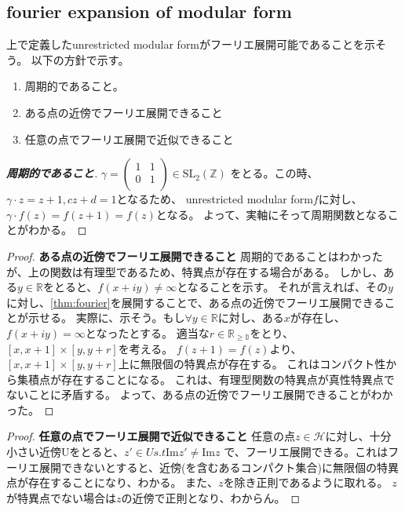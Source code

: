 \documentclass{ujarticle}
\begin{document}
\subsection{fourier expansion of modular form}
\label{sub:fourier expansion of modular form}
上で定義したunrestricted modular formがフーリエ展開可能であることを示そう。
以下の方針で示す。
\begin{enumerate}
  \setlength{\parskip}{0cm} %
  \setlength{\itemsep}{0cm} %
  \item 周期的であること。
  \item ある点の近傍でフーリエ展開できること
  \item 任意の点でフーリエ展開で近似できること
\end{enumerate}
\begin{proof}[\bf{周期的であること}]

$\gamma = \begin{pmatrix}
  1 & 1 \\
  0 & 1 \\
\end{pmatrix} \in \mathrm{SL}_2(\mathbb{Z})$
をとる。この時、$\gamma \cdot z = z +1, cz+d =1$となるため、
unrestricted modular form$f$に対し、$\gamma \cdot f(z)= f(z +1)=f(z)$となる。
よって、実軸にそって周期関数となることがわかる。
\end{proof}
\begin{proof}{\bf{ある点の近傍でフーリエ展開できること}}
周期的であることはわかったが、上の関数は有理型であるため、特異点が存在する場合がある。
しかし、ある$y \in \mathbb{R}$をとると、$f(x +iy) \neq \infty$となることを示す。
それが言えれば、その$y$に対し、\ref{thm:fourier}を展開することで、ある点の近傍でフーリエ展開できることが示せる。
実際に、示そう。もし$ \forall y \in \mathbb{R}$に対し、ある$x$が存在し、$f(x +iy)=\infty$となったとする。
適当な$r \in \mathbb{R_{\ge 0}}$をとり、$[x,x+1] \times [y,y +r]$を考える。
$f(z + 1)=f(z)$より、$[x,x+1] \times [y,y +r]$上に無限個の特異点が存在する。
これはコンパクト性から集積点が存在することになる。
これは、有理型関数の特異点が真性特異点でないことに矛盾する。
よって、ある点の近傍でフーリエ展開できることがわかった。
\end{proof}
\begin{proof}{\bf{任意の点でフーリエ展開で近似できること}}
  任意の点$z \in \mathcal{H}$に対し、十分小さい近傍Uをとると、$z' \in U s.t \mathrm{Im}z' \neq \mathrm{Im}z$
  で、フーリエ展開できる。これはフーリエ展開できないとすると、近傍(を含むあるコンパクト集合)に無限個の特異点が存在することになり、わかる。
  また、$z$を除き正則であるように取れる。
  $z$が特異点でない場合は$z$の近傍で正則となり、わからん。

\end{proof}
\end{document}
